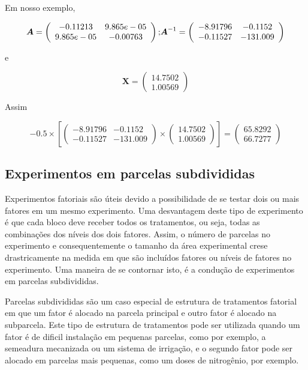 \documentclass[
]{book}
\numberwithin{equation}{section}
\newcommand{\indt}[1]{\index{#1|ST}}
\begin{document}
Em nosso exemplo,

\[
{\boldsymbol{A}} = \left( {\begin{array}{*{20}{c}}{ - 0.11213}&{9.865e - 05}\\{9.865e - 05}&{ - 0.00763}\end{array}} \right){\rm{; }}{{\boldsymbol{A}}^{ - 1}} = \left( {\begin{array}{*{20}{c}}{ - 8.91796}&{ - 0.1152}\\{ - 0.11527}&{ - 131.009}\end{array}} \right)
\]

e

\[
{\boldsymbol{X}} = \left( \begin{array}{l}14.7502\\1.00569\end{array} \right)
\]

Assim

\[
- 0.5 \times \left[ {\left( {\begin{array}{*{20}{c}}{ - 8.91796}&{ - 0.1152}\\{ - 0.11527}&{ - 131.009}\end{array}} \right) \times \left( \begin{array}{l}14.7502\\1.00569\end{array} \right)} \right] = \left( \begin{array}{l}65.8292\\66.7277\end{array} \right)
\]

\hypertarget{experimentos-em-parcelas-subdivididas}{%
\subsection{Experimentos em parcelas subdivididas}\label{experimentos-em-parcelas-subdivididas}}

Experimentos fatoriais são úteis devido a possibilidade de se testar dois ou mais fatores em um mesmo experimento. Uma desvantagem deste tipo de experimento é que cada bloco deve receber todos os tratamentos, ou seja, todas as combinações dos níveis dos dois fatores. Assim, o número de parcelas no experimento e consequentemente o tamanho da área experimental crese drastricamente na medida em que são incluídos fatores ou níveis de fatores no experimento. Uma maneira de se contornar isto, é a condução de experimentos em parcelas subdivididas.

Parcelas subdivididas \indt{parcelas subdivididas} são um caso especial de estrutura de tratamentos fatorial em que um fator é alocado na parcela principal e outro fator é alocado na subparcela. Este tipo de estrutura de tratamentos pode ser utilizada quando um fator é de dificil instalação em pequenas parcelas, como por exemplo, a semeadura mecanizada ou um sistema de irrigação, e o segundo fator pode ser alocado em parcelas mais pequenas, como um doses de nitrogênio, por exemplo.
\end{document}
